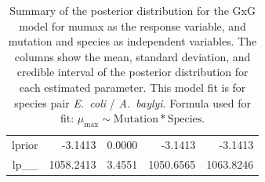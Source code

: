 \begin{table}[ht]
\begin{tabular}{rrrrr}
  lprior & -3.1413 & 0.0000 & -3.1413 & -3.1413 \\ 
  lp\_\_ & 1058.2413 & 3.4551 & 1050.6565 & 1063.8246 \\ 
   \hline
\end{tabular}
\caption{Summary of the posterior distribution for the GxG model for mumax as the response variable, and mutation and species as independent variables. The columns show the mean, standard deviation, and credible interval of the posterior distribution for each estimated parameter. This model fit is for species pair \textit{E.~coli} / \textit{A.~baylyi}.  Formula used for fit: $\mu_{\text{max}} \sim \text{Mutation} * \text{Species}$.} 
\label{supptab:GxG_mumax_EC_AB}
\end{table}



